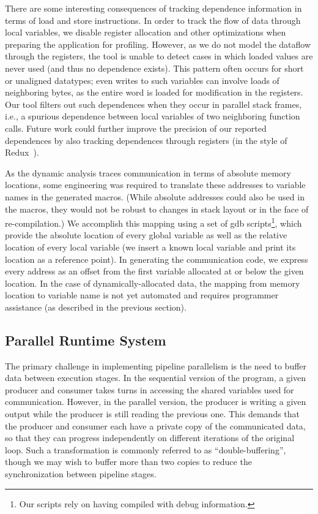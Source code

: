 There are some interesting consequences of tracking dependence
information in terms of load and store instructions.  In order to
track the flow of data through local variables, we disable register
allocation and other optimizations when preparing the application for
profiling.  However, as we do not model the dataflow through the
registers, the tool is unable to detect cases in which loaded values
are never used (and thus no dependence exists).  This pattern often
occurs for short or unaligned datatypes; even writes to such variables
can involve loads of neighboring bytes, as the entire word is loaded
for modification in the registers.  Our tool filters out such
dependences when they occur in parallel stack frames, i.e., a spurious
dependence between local variables of two neighboring function calls.
Future work could further improve the precision of our reported
dependences by also tracking dependences through registers (in the
style of Redux~\cite{nethercote03redux}).

As the dynamic analysis traces communication in terms of absolute
memory locations, some engineering was required to translate these
addresses to variable names in the generated macros.  (While absolute
addresses could also be used in the macros, they would not be robust
to changes in stack layout or in the face of re-compilation.)  We
accomplish this mapping using a set of gdb scripts\footnote{Our
  scripts rely on having compiled with debug information.}, which
provide the absolute location of every global variable as well as the
relative location of every local variable (we insert a known local
variable and print its location as a reference point).  In generating
the communication code, we express every address as an offset from the
first variable allocated at or below the given location.
In the case of dynamically-allocated data, the mapping from memory
location to variable name is not yet automated and requires programmer
assistance (as described in the previous section).

\subsection*{Parallel Runtime System}

The primary challenge in implementing pipeline parallelism is the need
to buffer data between execution stages.  In the sequential version of
the program, a given producer and consumer takes turns in accessing
the shared variables used for communication.  However, in the parallel
version, the producer is writing a given output while the producer is
still reading the previous one.  This demands that the producer and
consumer each have a private copy of the communicated data, so that
they can progress independently on different iterations of the
original loop.  Such a transformation is commonly referred to as
``double-buffering'', though we may wish to buffer more than two
copies to reduce the synchronization between pipeline stages.


